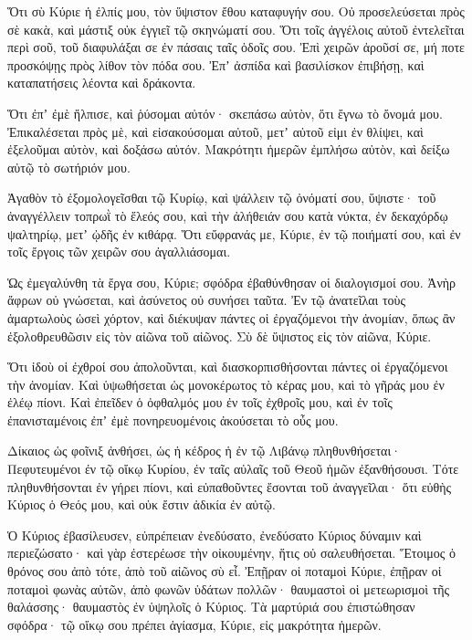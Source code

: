 \begin{spacing}{1.1}
\begin{multicols}{2}
Ὅτι σὺ Κύριε ἡ ἐλπίς μου, τὸν ὕψιστον ἔθου καταφυγήν σου.
Οὐ προσελεύσεται πρὸς σὲ κακὰ, καὶ μάστιξ οὐκ ἐγγιεῖ τῷ σκηνώματί σου.
Ὅτι τοῖς ἀγγέλοις αὐτοῦ ἐντελεῖται περὶ σοῦ, τοῦ διαφυλάξαι σε ἐν πάσαις ταῖς ὁδοῖς σου.
Ἐπὶ χειρῶν ἀροῦσί σε, μή ποτε προσκόψῃς πρὸς λίθον τὸν πόδα σου.
Ἐπʼ ἀσπίδα καὶ βασιλίσκον ἐπιβήσῃ, καὶ καταπατήσεις λέοντα καὶ δράκοντα.

Ὅτι ἐπʼ ἐμὲ ἤλπισε, καὶ ῥύσομαι αὐτόν· σκεπάσω αὐτὸν, ὅτι ἔγνω τὸ ὄνομά μου.
Ἐπικαλέσεται πρὸς μὲ, καὶ εἰσακούσομαι αὐτοῦ, μετʼ αὐτοῦ εἰμι ἐν θλίψει, καὶ ἐξελοῦμαι αὐτὸν, καὶ δοξάσω αὐτόν.
Μακρότητι ἡμερῶν ἐμπλήσω αὐτὸν, καὶ δείξω αὐτῷ τὸ σωτήριόν μου.

Ἀγαθὸν τὸ ἐξομολογεῖσθαι τῷ Κυρίῳ, καὶ ψάλλειν τῷ ὀνόματί σου, ὕψιστε·
τοῦ ἀναγγέλλειν τοπρωῒ τὸ ἔλεός σου, καὶ τὴν ἀλήθειάν σου κατὰ νύκτα,
ἐν δεκαχόρδῳ ψαλτηρίῳ, μετʼ ᾠδῆς ἐν κιθάρᾳ.
Ὅτι εὔφρανάς με, Κύριε, ἐν τῷ ποιήματί σου, καὶ ἐν τοῖς ἔργοις τῶν χειρῶν σου ἀγαλλιάσομαι.

Ὡς ἐμεγαλύνθη τὰ ἔργα σου, Κύριε; σφόδρα ἐβαθύνθησαν οἱ διαλογισμοί σου.
Ἀνὴρ ἄφρων οὐ γνώσεται, καὶ ἀσύνετος οὐ συνήσει ταῦτα.
Ἐν τῷ ἀνατεῖλαι τοὺς ἁμαρτωλοὺς ὡσεὶ χόρτον, καὶ διέκυψαν πάντες οἱ ἐργαζόμενοι τὴν ἀνομίαν, ὅπως ἂν ἐξολοθρευθῶσιν εἰς τὸν αἰῶνα τοῦ αἰῶνος.
Σὺ δὲ ὕψιστος εἰς τὸν αἰῶνα, Κύριε.

Ὅτι ἰδοὺ οἱ ἐχθροί σου ἀπολοῦνται, καὶ διασκορπισθήσονται πάντες οἱ ἐργαζόμενοι τὴν ἀνομίαν.
Καὶ ὑψωθήσεται ὡς μονοκέρωτος τὸ κέρας μου, καὶ τὸ γῆράς μου ἐν ἐλέῳ πίονι.
Καὶ ἐπεῖδεν ὁ ὀφθαλμός μου ἐν τοῖς ἐχθροῖς μου, καὶ ἐν τοῖς ἐπανισταμένοις ἐπʼ ἐμὲ πονηρευομένοις ἀκούσεται τὸ οὖς μου.

Δίκαιος ὡς φοῖνιξ ἀνθήσει, ὡς ἡ κέδρος ἡ ἐν τῷ Λιβάνῳ πληθυνθήσεται·
Πεφυτευμένοι ἐν τῷ οἴκῳ Κυρίου, ἐν ταῖς αὐλαῖς τοῦ Θεοῦ ἡμῶν ἐξανθήσουσι.
Τότε πληθυνθήσονται ἐν γήρει πίονι, καὶ εὐπαθοῦντες ἔσονται
τοῦ ἀναγγεῖλαι· ὅτι εὐθὴς Κύριος ὁ Θεός μου, καὶ οὐκ ἔστιν ἀδικία ἐν αὐτῷ.

Ὁ Κύριος ἐβασίλευσεν, εὐπρέπειαν ἐνεδύσατο, ἐνεδύσατο Κύριος δύναμιν καὶ περιεζώσατο· καὶ γὰρ ἐστερέωσε τὴν οἰκουμένην, ἥτις οὐ σαλευθήσεται.
Ἕτοιμος ὁ θρόνος σου ἀπὸ τότε, ἀπὸ τοῦ αἰῶνος σὺ εἶ.
Ἐπῇραν οἱ ποταμοὶ Κύριε, ἐπῇραν οἱ ποταμοὶ φωνὰς αὐτῶν,
ἀπὸ φωνῶν ὑδάτων πολλῶν· θαυμαστοὶ οἱ μετεωρισμοὶ τῆς θαλάσσης· θαυμαστὸς ἐν ὑψηλοῖς ὁ Κύριος.
Τὰ μαρτύριά σου ἐπιστώθησαν σφόδρα· τῷ οἴκῳ σου πρέπει ἁγίασμα, Κύριε, εἰς μακρότητα ἡμερῶν.


\end{multicols}
\end{spacing}
